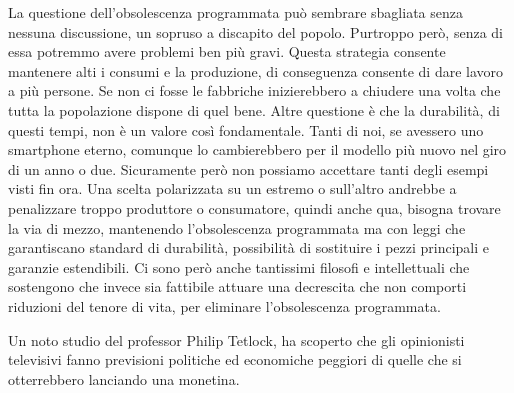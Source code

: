 \documentclass[12pt]{book} %
\begin{document}
La questione dell'obsolescenza programmata può sembrare sbagliata senza nessuna discussione, un
sopruso a discapito del popolo. Purtroppo però, senza di essa potremmo avere problemi ben più gravi. Questa strategia
consente mantenere alti i consumi e la produzione, di conseguenza consente di dare lavoro a più persone. Se non ci
fosse le fabbriche inizierebbero a chiudere una volta che tutta la popolazione dispone di quel bene. Altre questione è
che la durabilità, di questi tempi, non è un valore così fondamentale. Tanti di noi, se avessero uno smartphone eterno,
comunque lo cambierebbero per il modello più nuovo nel giro di un anno o due. Sicuramente però non possiamo accettare
tanti degli esempi visti fin ora. Una scelta polarizzata su un estremo o sull'altro andrebbe a
penalizzare troppo produttore o consumatore, quindi anche qua, bisogna trovare la via di mezzo, mantenendo
l'obsolescenza programmata ma con leggi che garantiscano standard di durabilità, possibilità di
sostituire i pezzi principali e garanzie estendibili. Ci sono però anche tantissimi filosofi e intellettuali che
sostengono che invece sia fattibile attuare una decrescita che non comporti riduzioni del tenore di vita, per eliminare
l'obsolescenza programmata.

Un noto studio del professor Philip Tetlock, ha scoperto che gli opinionisti televisivi fanno previsioni politiche ed
economiche peggiori di quelle che si otterrebbero lanciando una monetina. 
\end{document}
